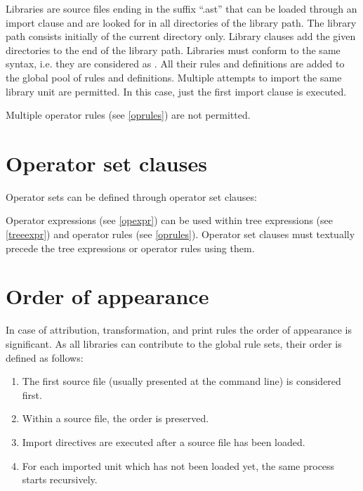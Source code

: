 Libraries are source files ending in the suffix ``.ast'' that can
be loaded through an import clause and are looked for in all
directories of the library path. The library path consists initially
of the current directory only. Library clauses add the given directories
to the end of the library path. Libraries must conform to the
same syntax, i.e. they are considered as . All their
rules and definitions are added to the global pool of rules and definitions.
Multiple attempts to import the same library unit are permitted. In this
case, just the first import clause is executed.

Multiple operator rules (see \ref{oprules}) are not permitted.

\section{Operator set clauses}\label{opset}

Operator sets can be defined through operator set clauses:

\begin{grammar}
      \produces {} 
	 \lextoken{=}  \lextoken{;}
\end{grammar}

\noindent
Operator expressions (see \ref{opexpr}) can be used within
tree expressions (see \ref{treeexpr}) and operator rules
(see \ref{oprules}). Operator set clauses must textually precede the
tree expressions or operator rules using them.

\section{Order of appearance}

In case of attribution, transformation, and print rules the order
of appearance is significant. As all libraries can contribute to the
global rule sets, their order is defined as follows:

\begin{enumerate}
   \item The first source file (usually presented at the command line)
      is considered first.
   \item Within a source file, the order is preserved.
   \item Import directives are executed after a source file has been
      loaded.
   \item For each imported unit which has not been loaded yet, the
      same process starts recursively.
\end{enumerate}

